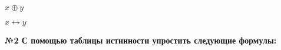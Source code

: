     \begin{minipage}[t]{0.25\textwidth}
        \begin{enumerate}
            \setcounter{enumi}{3}
            \begin{spacing}{0.5}
                \item $x \oplus y$\\
            \end{spacing}
            \setcounter{enumi}{7}
            \begin{spacing}{0.5}
                \item $x \leftrightarrow y$\\
            \end{spacing}
        \end{enumerate}
    \end{minipage}

    \begin{center}
        \textbf{№2 С помощью таблицы истинности упростить следующие формулы:}
    \end{center}

